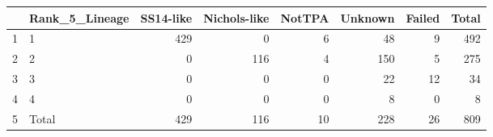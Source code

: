 \begin{table}[ht]
\centering
\begin{tabular}{llrrrrrr}
  \hline
 & Rank\_5\_Lineage & SS14-like & Nichols-like & NotTPA & Unknown & Failed & Total \\ 
  \hline
1 & 1 & 429 & 0 & 6 & 48 & 9 & 492 \\ 
  2 & 2 & 0 & 116 & 4 & 150 & 5 & 275 \\ 
  3 & 3 & 0 & 0 & 0 & 22 & 12 & 34 \\ 
  4 & 4 & 0 & 0 & 0 & 8 & 0 & 8 \\ 
  5 & Total & 429 & 116 & 10 & 228 & 26 & 809 \\ 
   \hline
\end{tabular}
\end{table}
